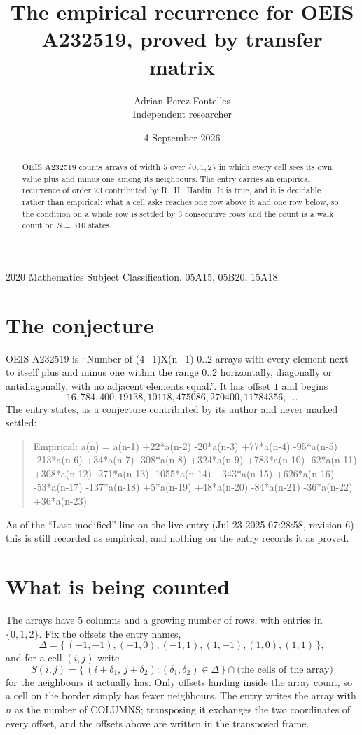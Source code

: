 \documentclass[11pt,a4paper]{article}
\title{The empirical recurrence for OEIS A232519, proved by transfer matrix}
\author{Adrian Perez Fontelles\\ \small Independent researcher}
\date{4 September 2026}
\theoremstyle{plain}
\theoremstyle{definition}
\begin{document}
\maketitle

\begin{abstract}
OEIS A232519 counts arrays of width $5$ over $\{0,1,2\}$ in which every cell sees its own value plus and minus one among its neighbours. The entry carries an
empirical recurrence of order $23$ contributed by R.~H.~Hardin. It is true, and it is
decidable rather than empirical: what a cell asks reaches one row above it and one row below, so the
condition on a whole row is settled by $3$ consecutive rows and the count is a walk
count on $S=510$ states.
\end{abstract}

\noindent\small 2020 Mathematics Subject Classification. 05A15, 05B20, 15A18.\normalsize

\section{The conjecture}

OEIS A232519 is ``Number of (4+1)X(n+1) 0..2 arrays with every element next to itself plus and minus one within the range 0..2 horizontally, diagonally or antidiagonally, with no adjacent elements equal.''. It has offset $1$ and begins
\[
16, 784, 400, 19138, 10118, 475086, 270400, 11784356,\ \dots
\]
The entry states, as a conjecture contributed by its author and never marked settled:
\begin{quote}
Empirical: a(n) = a(n-1) +22*a(n-2) -20*a(n-3) +77*a(n-4) -95*a(n-5) -213*a(n-6) +34*a(n-7) -308*a(n-8) +324*a(n-9) +783*a(n-10) -62*a(n-11) +308*a(n-12) -271*a(n-13) -1055*a(n-14) +343*a(n-15) +626*a(n-16) -53*a(n-17) -137*a(n-18) +5*a(n-19) +48*a(n-20) -84*a(n-21) -36*a(n-22) +36*a(n-23)
\end{quote}
As of the ``Last modified'' line on the live entry (Jul 23 2025 07:28:58, revision 6) this is still
recorded as empirical, and nothing on the entry records it as proved.

\section{What is being counted}

The arrays have $5$ columns and a growing number of rows, with entries in $\{0,1,2\}$. Fix the
offsets the entry names,
\[
\Delta=\{\,(-1,-1), (-1,0), (-1,1), (1,-1), (1,0), (1,1)\,\},
\]
and for a cell $(i,j)$ write
\[
S(i,j)=\{\,(i+\delta_1,\,j+\delta_2) : (\delta_1,\delta_2)\in\Delta\,\}\cap
\text{(the cells of the array)}
\]
for the neighbours it actually has. Only offsets landing inside the array count, so a cell on
the border simply has fewer neighbours. The entry writes the array with $n$ as the number of COLUMNS; transposing it exchanges the two coordinates of every offset, and the offsets above are written in the transposed frame.
\end{document}
